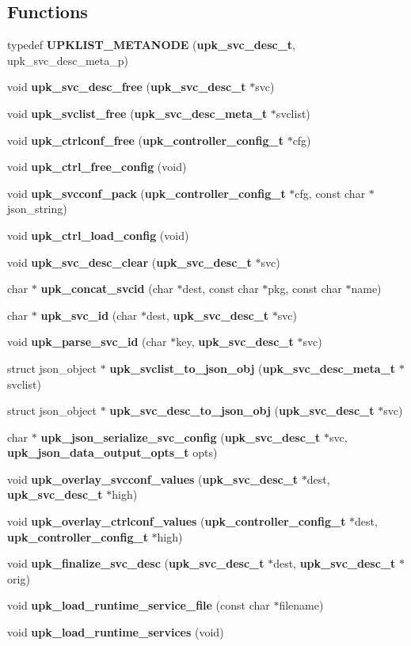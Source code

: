 \subsection*{Functions}
\begin{DoxyCompactItemize}
\item 
typedef {\bf UPKLIST\_\-METANODE} ({\bf upk\_\-svc\_\-desc\_\-t}, upk\_\-svc\_\-desc\_\-meta\_\-p)
\item 
void {\bf upk\_\-svc\_\-desc\_\-free} ({\bf upk\_\-svc\_\-desc\_\-t} $\ast$svc)
\item 
void {\bf upk\_\-svclist\_\-free} ({\bf upk\_\-svc\_\-desc\_\-meta\_\-t} $\ast$svclist)
\item 
void {\bf upk\_\-ctrlconf\_\-free} ({\bf upk\_\-controller\_\-config\_\-t} $\ast$cfg)
\item 
void {\bf upk\_\-ctrl\_\-free\_\-config} (void)
\item 
void {\bf upk\_\-svcconf\_\-pack} ({\bf upk\_\-controller\_\-config\_\-t} $\ast$cfg, const char $\ast$json\_\-string)
\item 
void {\bf upk\_\-ctrl\_\-load\_\-config} (void)
\item 
void {\bf upk\_\-svc\_\-desc\_\-clear} ({\bf upk\_\-svc\_\-desc\_\-t} $\ast$svc)
\item 
char $\ast$ {\bf upk\_\-concat\_\-svcid} (char $\ast$dest, const char $\ast$pkg, const char $\ast$name)
\item 
char $\ast$ {\bf upk\_\-svc\_\-id} (char $\ast$dest, {\bf upk\_\-svc\_\-desc\_\-t} $\ast$svc)
\item 
void {\bf upk\_\-parse\_\-svc\_\-id} (char $\ast$key, {\bf upk\_\-svc\_\-desc\_\-t} $\ast$svc)
\item 
struct json\_\-object $\ast$ {\bf upk\_\-svclist\_\-to\_\-json\_\-obj} ({\bf upk\_\-svc\_\-desc\_\-meta\_\-t} $\ast$svclist)
\item 
struct json\_\-object $\ast$ {\bf upk\_\-svc\_\-desc\_\-to\_\-json\_\-obj} ({\bf upk\_\-svc\_\-desc\_\-t} $\ast$svc)
\item 
char $\ast$ {\bf upk\_\-json\_\-serialize\_\-svc\_\-config} ({\bf upk\_\-svc\_\-desc\_\-t} $\ast$svc, {\bf upk\_\-json\_\-data\_\-output\_\-opts\_\-t} opts)
\item 
void {\bf upk\_\-overlay\_\-svcconf\_\-values} ({\bf upk\_\-svc\_\-desc\_\-t} $\ast$dest, {\bf upk\_\-svc\_\-desc\_\-t} $\ast$high)
\item 
void {\bf upk\_\-overlay\_\-ctrlconf\_\-values} ({\bf upk\_\-controller\_\-config\_\-t} $\ast$dest, {\bf upk\_\-controller\_\-config\_\-t} $\ast$high)
\item 
void {\bf upk\_\-finalize\_\-svc\_\-desc} ({\bf upk\_\-svc\_\-desc\_\-t} $\ast$dest, {\bf upk\_\-svc\_\-desc\_\-t} $\ast$orig)
\item 
void {\bf upk\_\-load\_\-runtime\_\-service\_\-file} (const char $\ast$filename)
\item 
void {\bf upk\_\-load\_\-runtime\_\-services} (void)
\end{DoxyCompactItemize}
